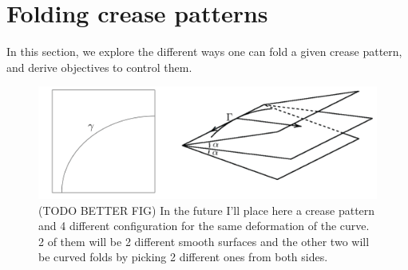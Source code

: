 \section{Folding crease patterns} \label{sec:folding}
In this section, we explore the different ways one can fold a given crease pattern, and derive objectives to control them.

\begin{figure} [h]
	\centering
	\includegraphics[width=0.7\linewidth]{figures/curved_fold_through_curve.pdf}
	\caption{(TODO BETTER FIG) In the future I'll place here a crease pattern and 4 different configuration for the same deformation of the curve. 2 of them will be 2 different smooth surfaces and the other two will be curved folds by picking 2 different ones from both sides. }
	\label{fig:curved_fold_through_curve}
\end{figure}

